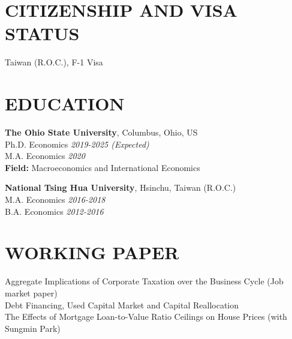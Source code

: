 \documentclass[12pt]{res} %
\begin{document}
\begin{resume}

\section{CITIZENSHIP AND VISA STATUS}
\vspace{8pt} %
Taiwan (R.O.C.), F-1 Visa


\section{EDUCATION}
\vspace{8pt} %
{\bf The Ohio State University}, Columbus, Ohio, US \\
Ph.D. Economics \hfill  \textit{2019-2025 (\textit{Expected})} \\
M.A. Economics \hfill  \textit{2020} \\
\textbf{Field: } Macroeconomics and International Economics

{\bf National Tsing Hua University}, Hsinchu, Taiwan (R.O.C.) \\
M.A. Economics \hfill  \textit{2016-2018} \\
B.A. Economics \hfill  \textit{2012-2016}


\section{WORKING PAPER}
\label{sec:research_experience}
\vspace{8pt} %
Aggregate Implications of Corporate Taxation over the Business Cycle (Job market paper) \\
Debt Financing, Used Capital Market and Capital Reallocation \\
The Effects of Mortgage Loan-to-Value Ratio Ceilings on House Prices (with Sungmin Park)




\end{resume}
\end{document}
